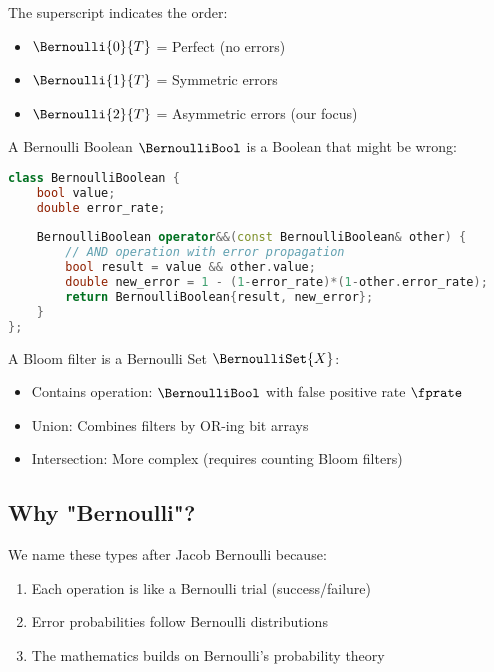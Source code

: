 The superscript indicates the order:
\begin{itemize}
    \item $\Bernoulli{0}{T}$ = Perfect (no errors)
    \item $\Bernoulli{1}{T}$ = Symmetric errors
    \item $\Bernoulli{2}{T}$ = Asymmetric errors (our focus)
\end{itemize}

\begin{example}
A Bernoulli Boolean $\BernoulliBool$ is a Boolean that might be wrong:

\begin{lstlisting}[language=C++]
class BernoulliBoolean {
    bool value;
    double error_rate;
    
    BernoulliBoolean operator&&(const BernoulliBoolean& other) {
        // AND operation with error propagation
        bool result = value && other.value;
        double new_error = 1 - (1-error_rate)*(1-other.error_rate);
        return BernoulliBoolean{result, new_error};
    }
};
\end{lstlisting}
\end{example}

\begin{example}
A Bloom filter is a Bernoulli Set $\BernoulliSet{X}$:
\begin{itemize}
    \item Contains operation: $\BernoulliBool$ with false positive rate $\fprate$
    \item Union: Combines filters by OR-ing bit arrays
    \item Intersection: More complex (requires counting Bloom filters)
\end{itemize}
\end{example}

\subsection{Why "Bernoulli"?}

We name these types after Jacob Bernoulli because:
\begin{enumerate}
    \item Each operation is like a Bernoulli trial (success/failure)
    \item Error probabilities follow Bernoulli distributions
    \item The mathematics builds on Bernoulli's probability theory
\end{enumerate}

